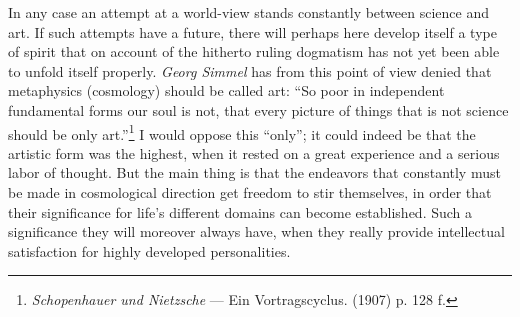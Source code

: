\documentclass[12pt,a4paper]{book}
\begin{document}
In any case an attempt at a world-view stands constantly between science and art. If such attempts
have a future, there will perhaps here develop itself a type of spirit that on account of the
hitherto ruling dogmatism has not yet been able to unfold itself properly. \emph{Georg Simmel} has
from this point of view denied that metaphysics (cosmology) should be called art: ``So poor in
independent fundamental forms our soul is not, that every picture of things that is not science
should be only art.''\footnote{\emph{Schopenhauer und Nietzsche} --- Ein Vortragscyclus. (1907) p.
128 f.} I would oppose this ``only''; it could indeed be that the artistic form was the highest, when
it rested on a great experience and a serious labor of thought. But the main thing is that the
endeavors that constantly must be made in cosmological direction get freedom to stir themselves, in
order that their significance for life's different domains can become established. Such a significance
they will moreover always have, when they really provide intellectual satisfaction for highly
developed personalities.
\end{document}
